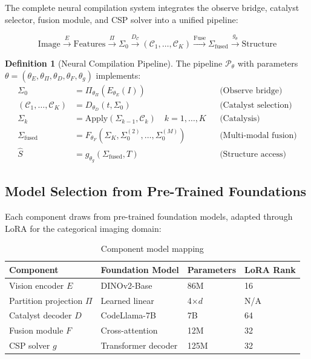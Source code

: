 \documentclass[11pt,a4paper]{article}
\theoremstyle{definition}
\newtheorem{definition}[theorem]{Definition}
\theoremstyle{remark}
\newcommand{\Sig}{\Sigma}
\newcommand{\catalyst}{\mathcal{C}}
\newcommand{\params}{\theta}
\begin{document}
The complete neural compilation system integrates the observe bridge, catalyst selector, fusion module, and CSP solver into a unified pipeline:

\begin{equation}
\text{Image} \xrightarrow{E} \text{Features} \xrightarrow{\Pi} \Sig_0 \xrightarrow{D_\catalyst} (\catalyst_1, \ldots, \catalyst_K) \xrightarrow{\text{Fuse}} \Sig_{\text{fused}} \xrightarrow{g_\params} \text{Structure}
\end{equation}

\begin{definition}[Neural Compilation Pipeline]
\label{def:pipeline}
The pipeline $\mathcal{P}_\params$ with parameters $\params = (\params_E, \params_\Pi, \params_D, \params_F, \params_g)$ implements:
\begin{align}
\Sig_0 &= \Pi_{\params_\Pi}(E_{\params_E}(I)) && \text{(Observe bridge)} \\
(\catalyst_1, \ldots, \catalyst_K) &= D_{\params_D}(t, \Sig_0) && \text{(Catalyst selection)} \\
\Sig_k &= \text{Apply}(\Sig_{k-1}, \catalyst_k) \quad k = 1, \ldots, K && \text{(Catalysis)} \\
\Sig_{\text{fused}} &= F_{\params_F}(\Sig_K, \Sig_0^{(2)}, \ldots, \Sig_0^{(M)}) && \text{(Multi-modal fusion)} \\
\hat{S} &= g_{\params_g}(\Sig_{\text{fused}}, T) && \text{(Structure access)}
\end{align}
\end{definition}

\subsection{Model Selection from Pre-Trained Foundations}

Each component draws from pre-trained foundation models, adapted through LoRA for the categorical imaging domain:

\begin{table}[H]
\centering
\caption{Component model mapping}
\label{tab:models}
\begin{tabular}{@{}llll@{}}
\toprule
Component & Foundation Model & Parameters & LoRA Rank \\
\midrule
Vision encoder $E$ & DINOv2-Base & 86M & 16 \\
Partition projection $\Pi$ & Learned linear & 4$\times d$ & N/A \\
Catalyst decoder $D$ & CodeLlama-7B & 7B & 64 \\
Fusion module $F$ & Cross-attention & 12M & 32 \\
CSP solver $g$ & Transformer decoder & 125M & 32 \\
\bottomrule
\end{tabular}
\end{table}
\end{document}
